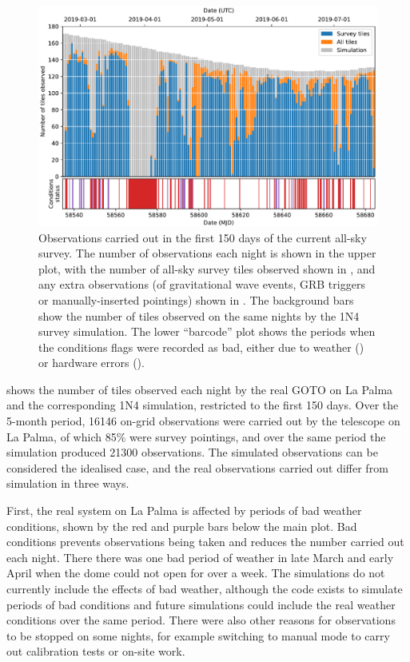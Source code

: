 \begin{colsection}
\begin{colsection}
\begin{figure}[t]
    \begin{center}
        \includegraphics[width=\linewidth]{images/150.pdf}
    \end{center}
    \caption[Observations carried out in the first 150 days of the all-sky survey]{
        Observations carried out in the first 150 days of the current all-sky survey. The number of observations each night is shown in the upper plot, with the number of all-sky survey tiles observed shown in , and any extra observations (of gravitational wave events, GRB triggers or manually-inserted pointings) shown in . The background  bars show the number of tiles observed on the same nights by the 1N4 survey simulation. The lower ``barcode'' plot shows the periods when the conditions flags were recorded as bad, either due to weather () or hardware errors ().
    }\label{fig:150}
\end{figure}

 shows the number of tiles observed each night by the real GOTO on La Palma and the corresponding 1N4 simulation, restricted to the first 150 days. Over the 5-month period, 16146 on-grid observations were carried out by the telescope on La Palma, of which 85\% were survey pointings, and over the same period the simulation produced 21300 observations. The simulated observations can be considered the idealised case, and the real observations carried out differ from simulation in three ways.

First, the real system on La Palma is affected by periods of bad weather conditions, shown by the red and purple bars below the main plot. Bad conditions prevents observations being taken and reduces the number carried out each night. There there was one bad period of weather in late March and early April when the dome could not open for over a week. The simulations do not currently include the effects of bad weather, although the code exists to simulate periods of bad conditions and future simulations could include the real weather conditions over the same period. There were also other reasons for observations to be stopped on some nights, for example switching to manual mode to carry out calibration tests or on-site work.


\end{colsection}
\end{colsection}
